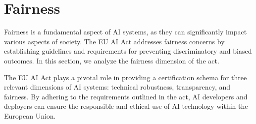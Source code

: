 \documentclass{article}
\begin{document}
\section{Fairness}

Fairness is a fundamental aspect of AI systems, as they can significantly impact various aspects of society. The EU AI Act addresses fairness concerns by establishing guidelines and requirements for preventing discriminatory and biased outcomes. In this section, we analyze the fairness dimension of the act.

The EU AI Act plays a pivotal role in providing a certification schema for three relevant dimensions of AI systems: technical robustness, transparency, and fairness. By adhering to the requirements outlined in the act, AI developers and deployers can ensure the responsible and ethical use of AI technology within the European Union.


\printbibliography
\end{document}

